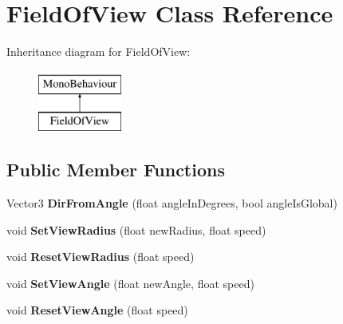 \hypertarget{class_field_of_view}{}\section{Field\+Of\+View Class Reference}
\label{class_field_of_view}
Inheritance diagram for Field\+Of\+View\+:\begin{figure}[H]
\begin{center}
\leavevmode
\includegraphics[height=2.000000cm]{class_field_of_view}
\end{center}
\end{figure}
\subsection*{Public Member Functions}
\begin{DoxyCompactItemize}
\item 
\hypertarget{class_field_of_view_a7ed88ff45d86dff4d1a75bc96423488d}{}\label{class_field_of_view_a7ed88ff45d86dff4d1a75bc96423488d} 
Vector3 {\bfseries Dir\+From\+Angle} (float angle\+In\+Degrees, bool angle\+Is\+Global)
\item 
\hypertarget{class_field_of_view_a17355381fe448bb0c7730c3be27423cd}{}\label{class_field_of_view_a17355381fe448bb0c7730c3be27423cd} 
void {\bfseries Set\+View\+Radius} (float new\+Radius, float speed)
\item 
\hypertarget{class_field_of_view_ad2e1145e65b657ca2d5f82ef2ba9a04c}{}\label{class_field_of_view_ad2e1145e65b657ca2d5f82ef2ba9a04c} 
void {\bfseries Reset\+View\+Radius} (float speed)
\item 
\hypertarget{class_field_of_view_ac1c7f7e2d3d528a2ecb97a6c54a81341}{}\label{class_field_of_view_ac1c7f7e2d3d528a2ecb97a6c54a81341} 
void {\bfseries Set\+View\+Angle} (float new\+Angle, float speed)
\item 
\hypertarget{class_field_of_view_a122098c82aea3bbffbb0bc063c5d588d}{}\label{class_field_of_view_a122098c82aea3bbffbb0bc063c5d588d} 
void {\bfseries Reset\+View\+Angle} (float speed)
\end{DoxyCompactItemize}
